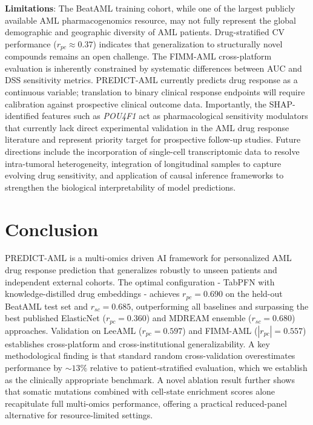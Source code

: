 \documentclass[pdflatex,sn-mathphys-num]{sn-jnl}
\theoremstyle{thmstyleone}
\theoremstyle{thmstyletwo}
\theoremstyle{thmstylethree}
\begin{document}
\textbf{Limitations}: The BeatAML training cohort, while one of the largest publicly available AML pharmacogenomics resource, may not fully represent the global demographic and geographic diversity of AML patients. Drug-stratified CV performance ($r_{pc} \approx 0.37$) indicates that generalization to structurally novel compounds remains an open challenge. The FIMM-AML cross-platform evaluation is inherently constrained by systematic differences between AUC and DSS sensitivity metrics. PREDICT-AML currently predicts drug response as a continuous variable; translation to binary clinical response endpoints will require calibration against prospective clinical outcome data. Importantly, the SHAP-identified features such as %
\textit{POU4F1} act as pharmacological sensitivity modulators that currently lack direct experimental validation in the AML drug response literature and represent priority target for prospective follow-up studies. Future directions include the incorporation of single-cell transcriptomic data to resolve intra-tumoral heterogeneity, integration of longitudinal samples to capture evolving drug sensitivity, and application of causal inference frameworks to strengthen the biological interpretability of model predictions.

\section{Conclusion}\label{sec5}
PREDICT-AML is a multi-omics driven AI framework for personalized AML drug response prediction that generalizes robustly to unseen patients and independent external cohorts. The optimal configuration - TabPFN with knowledge-distilled drug embeddings - achieves $r_{pc} = 0.690$ on the held-out BeatAML test set and $r_{sc} = 0.685$, outperforming all baselines and surpassing the best published ElasticNet ($r_{pc} = 0.360$) and MDREAM ensemble ($r_{sc} = 0.680$) approaches. Validation on LeeAML ($r_{pc} = 0.597$) and FIMM-AML ($|r_{pc}| = 0.557$) establishes cross-platform and cross-institutional generalizability. A key methodological finding is that standard random cross-validation overestimates performance by $\sim\!13\%$ relative to patient-stratified evaluation, which we establish as the clinically appropriate benchmark. A novel ablation result further shows that somatic mutations combined with cell-state enrichment scores alone recapitulate full multi-omics performance, offering a practical reduced-panel alternative for resource-limited settings.
\end{document}
